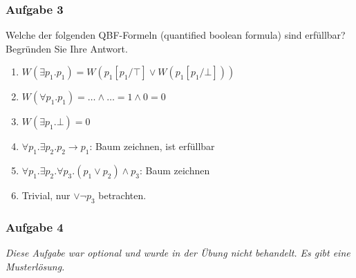 \subsubsection*{Aufgabe 3}
    Welche der folgenden QBF-Formeln (quantified boolean formula) sind erfüllbar? Begründen Sie Ihre Antwort.
    \begin{enumerate}
        \item $W(\exists p_{1}.p_{1}) = W(p_{1}[p_{1}/\top] \lor W(p_{1}[p_{1}/\bot]))${}
        \item $W(\forall p_{1}.p_{1}) = \dots \land \dots = 1 \land 0 = 0$
        \item $W(\exists p_{1}.\bot) = 0$
        \item $\forall p_{1}.\exists p_{2}. p_{2} \to p_{1}$: Baum zeichnen, ist erfüllbar
        \item $\forall p_{1}. \exists p_{2}. \forall p_{3}. (p_{1} \lor p_{2}) \land p_{3}$: Baum zeichnen
        \item Trivial, nur $\lor \neg p_{3}$ betrachten.
    \end{enumerate}


\subsubsection*{Aufgabe 4}
    \textit{Diese Aufgabe war optional und wurde in der Übung nicht behandelt. Es gibt eine Musterlösung.}


